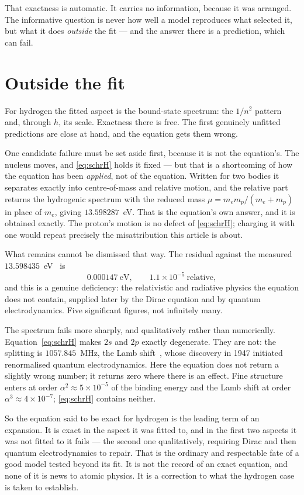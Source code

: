 \documentclass[11pt]{article}
\begin{document}
That exactness is automatic. It carries no information, because it was arranged. The informative
question is never how well a model reproduces what selected it, but what it does \emph{outside}
the fit --- and the answer there is a prediction, which can fail.

\section{Outside the fit}\label{sec:outside}

For hydrogen the fitted aspect is the bound-state spectrum: the $1/n^2$ pattern and, through $h$,
its scale. Exactness there is free. The first genuinely unfitted predictions are close at hand,
and the equation gets them wrong.

One candidate failure must be set aside first, because it is not the equation's. The nucleus
moves, and \eqref{eq:schrH} holds it fixed --- but that is a shortcoming of how the equation has
been \emph{applied}, not of the equation. Written for two bodies it separates exactly into
centre-of-mass and relative motion, and the relative part returns the hydrogenic spectrum with the
reduced mass $\mu = m_em_p/(m_e+m_p)$ in place of $m_e$, giving $13.598287$~eV. That is the
equation's own answer, and it is obtained exactly. The proton's motion is no defect of
\eqref{eq:schrH}; charging it with one would repeat precisely the misattribution this article is
about.

What remains cannot be dismissed that way. The residual against the measured
$13.598435$~eV~\cite{NIST} is
\[
0.000147~\text{eV}, \qquad 1.1\times10^{-5}\ \text{relative},
\]
and this is a genuine deficiency: the relativistic and radiative physics the equation does not
contain, supplied later by the Dirac equation and by quantum electrodynamics. Five significant
figures, not infinitely many.

The spectrum fails more sharply, and qualitatively rather than numerically.
Equation~\eqref{eq:schrH} makes $2s$ and $2p$ exactly degenerate. They are not: the splitting is
$1057.845$~MHz, the Lamb shift~\cite{LambRetherford}, whose discovery in 1947 initiated
renormalised quantum electrodynamics. Here the equation does not return a slightly wrong number;
it returns zero where there is an effect. Fine structure enters at order $\alpha^2 \approx
5\times10^{-5}$ of the binding energy and the Lamb shift at order $\alpha^3 \approx 4\times10^{-7}$;
\eqref{eq:schrH} contains neither.

So the equation said to be exact for hydrogen is the leading term of an expansion. It is exact in
the aspect it was fitted to, and in the first two aspects it was not fitted to it fails --- the
second one qualitatively, requiring Dirac and then quantum electrodynamics to repair. That is the
ordinary and respectable fate of a good model tested beyond its fit. It is not the record of an
exact equation, and none of it is news to atomic physics. It is a correction to what the hydrogen
case is taken to establish.
\end{document}
